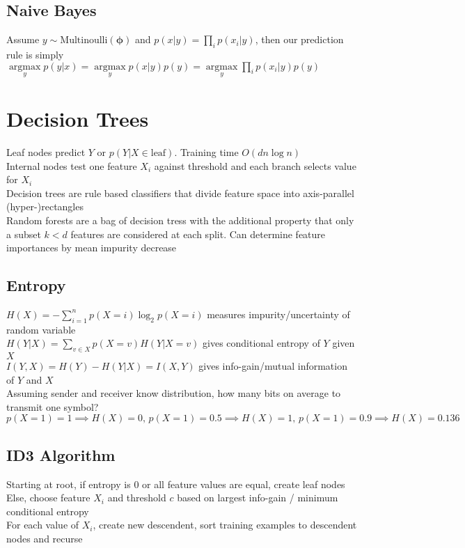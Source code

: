 \documentclass{article}
\DeclareMathOperator*{\argmax}{argmax}
\begin{document}
\subsection{Naive Bayes}
Assume $y \sim \mbox{Multinoulli}(\boldsymbol \phi)$ and $p(x|y) = \prod_{i} p(x_i | y)$, then our prediction rule is simply \\
$\argmax\limits_y p(y | x) = \argmax\limits_y p(x|y)p(y) = \argmax\limits_y \prod_{i} p(x_i | y) p(y)$ 

\section{Decision Trees}
Leaf nodes predict $Y$ or $p(Y|X \in \mbox{leaf})$. Training time $O(dn\log n)$ \\ 
Internal nodes test one feature $X_i$ against threshold and each branch selects value for $X_i$ \\
Decision trees are rule based classifiers that divide feature space into axis-parallel (hyper-)rectangles \\
Random forests are a bag of decision tress with the additional property that only a subset $k < d$ features are considered at each split. Can determine feature importances by mean impurity decrease 

\subsection{Entropy}
$H(X) = -\sum \limits_{i=1}^n p(X = i)\log_2 p(X=i)$ measures impurity/uncertainty of random variable \\
$H(Y| X) = \sum \limits_{v \in X}p(X = v)H(Y | X = v)$ gives conditional entropy of $Y$ given $X$ \\
$I(Y, X) = H(Y) - H(Y|X) = I(X, Y)$ gives info-gain/mutual information of $Y$ and $X$ \\
Assuming sender and receiver know distribution, how many bits on average to transmit one symbol? \\
${p(X = 1) = 1 \implies H(X) = 0\mbox{, } p(X = 1) = 0.5 \implies H(X) = 1\mbox{, } p(X = 1) = 0.9 \implies H(X) = 0.136}$ 
\subsection{ID3 Algorithm}
Starting at root, if entropy is 0 or all feature values are equal, create leaf nodes \\
Else, choose feature $X_i$ and threshold $c$ based on largest info-gain / minimum conditional entropy \\
For each value of $X_i$, create new descendent, sort training examples to descendent nodes and recurse
\end{document}
